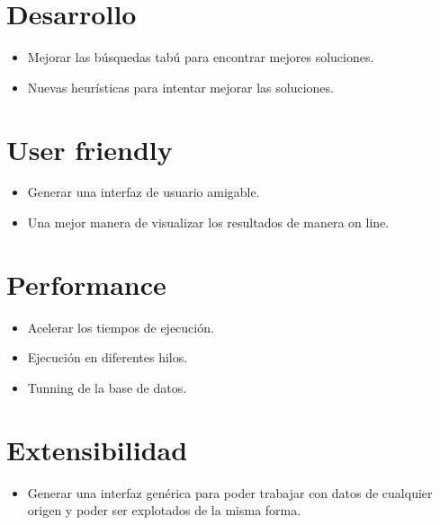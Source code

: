\section{Desarrollo}
\begin{itemize}
 \item Mejorar las búsquedas tabú para encontrar mejores soluciones.
 \item Nuevas heurísticas para intentar mejorar las soluciones.
\end{itemize}

 
\section{User friendly}
\begin{itemize}
 \item Generar una interfaz de usuario amigable.
 \item Una mejor manera de visualizar los resultados de manera on line.
\end{itemize}

\section{Performance}
\begin{itemize}
 \item Acelerar los tiempos de ejecución.
 \item Ejecución en diferentes hilos.
 \item Tunning de la base de datos.
\end{itemize}

\section{Extensibilidad}
\begin{itemize}
 \item Generar una interfaz genérica para poder trabajar con datos de cualquier origen y poder ser explotados de la misma forma.
\end{itemize}
